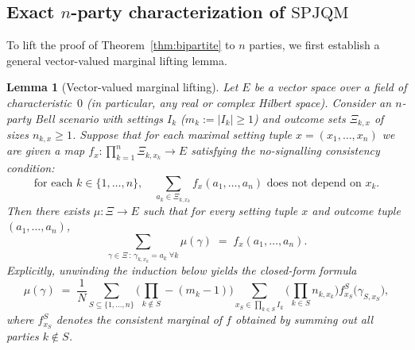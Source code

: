 \documentclass[11pt,a4paper]{article}
\newtheorem{lemma}[theorem]{Lemma}
\theoremstyle{definition}
\theoremstyle{remark}
\newcommand{\SPJQM}{\mathrm{SPJQM}}
\begin{document}
\subsection{Exact $n$-party characterization of $\SPJQM$}

To lift the proof of Theorem~\ref{thm:bipartite} to $n$ parties, we first establish a general vector-valued marginal lifting lemma.

\begin{lemma}[Vector-valued marginal lifting]
\label{lem:lifting}
Let $E$ be a vector space over a field of characteristic~$0$ (in particular, any real or complex Hilbert space). Consider an $n$-party Bell scenario with settings $I_k$ ($m_k := |I_k| \ge 1$) and outcome sets $\Xi_{k,x}$ of sizes $n_{k,x} \ge 1$. Suppose that for each maximal setting tuple $x = (x_1,\dots,x_n)$ we are given a map $f_x : \prod_{k=1}^n \Xi_{k,x_k} \to E$ satisfying the no-signalling consistency condition:
\begin{equation*}\label{eq:Ck}
\text{for each } k \in \{1,\dots,n\}, \quad \sum_{a_k \in \Xi_{k,x_k}} f_x(a_1,\dots,a_n) \text{ does not depend on } x_k. \tag{$C_k$}
\end{equation*}
Then there exists $\mu : \Xi \to E$ such that for every setting tuple $x$ and outcome tuple $(a_1,\dots,a_n)$,
\begin{equation}\label{eq:lift-marginal}
\sum_{\gamma \in \Xi \,:\, \gamma_{k,x_k} = a_k \;\forall k} \mu(\gamma) \;=\; f_x(a_1,\dots,a_n).
\end{equation}
Explicitly, unwinding the induction below yields the closed-form formula
\begin{equation}\label{eq:lift-unwound}
\mu(\gamma) \;=\; \frac{1}{N} \sum_{S \subseteq \{1,\dots,n\}} \Biggl(\prod_{k \notin S} -(m_k - 1)\Biggr)
\sum_{x_S \in \prod_{k \in S} I_k} \Biggl(\prod_{k \in S} n_{k,x_k}\Biggr) f^S_{x_S}\bigl(\gamma_{S, x_S}\bigr),
\end{equation}
where $f^S_{x_S}$ denotes the consistent marginal of $f$ obtained by summing out all parties $k \notin S$.
\end{lemma}
\end{document}
